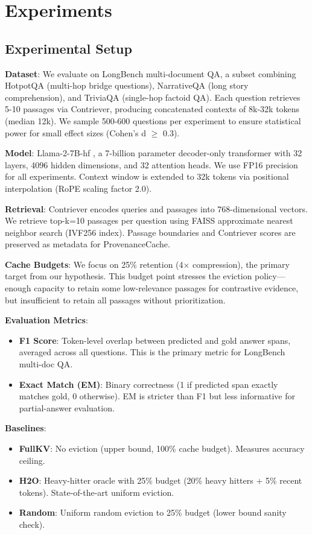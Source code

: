 \section{Experiments}

\subsection{Experimental Setup}

\textbf{Dataset}: We evaluate on LongBench multi-document QA, a subset combining HotpotQA (multi-hop bridge questions), NarrativeQA (long story comprehension), and TriviaQA (single-hop factoid QA). Each question retrieves 5-10 passages via Contriever, producing concatenated contexts of 8k-32k tokens (median 12k). We sample 500-600 questions per experiment to ensure statistical power for small effect sizes (Cohen's d $\geq$ 0.3).

\textbf{Model}: Llama-2-7B-hf \cite{touvron2023llama2}, a 7-billion parameter decoder-only transformer with 32 layers, 4096 hidden dimensions, and 32 attention heads. We use FP16 precision for all experiments. Context window is extended to 32k tokens via positional interpolation (RoPE scaling factor 2.0).

\textbf{Retrieval}: Contriever \cite{izacard2022contriever} encodes queries and passages into 768-dimensional vectors. We retrieve top-k=10 passages per question using FAISS approximate nearest neighbor search (IVF256 index). Passage boundaries and Contriever scores are preserved as metadata for ProvenanceCache.

\textbf{Cache Budgets}: We focus on 25\% retention (4$\times$ compression), the primary target from our hypothesis. This budget point stresses the eviction policy—enough capacity to retain some low-relevance passages for contrastive evidence, but insufficient to retain all passages without prioritization.

\textbf{Evaluation Metrics}:
\begin{itemize}
\item \textbf{F1 Score}: Token-level overlap between predicted and gold answer spans, averaged across all questions. This is the primary metric for LongBench multi-doc QA.
\item \textbf{Exact Match (EM)}: Binary correctness (1 if predicted span exactly matches gold, 0 otherwise). EM is stricter than F1 but less informative for partial-answer evaluation.
\end{itemize}

\textbf{Baselines}:
\begin{itemize}
\item \textbf{FullKV}: No eviction (upper bound, 100\% cache budget). Measures accuracy ceiling.
\item \textbf{H2O}: Heavy-hitter oracle with 25\% budget (20\% heavy hitters + 5\% recent tokens). State-of-the-art uniform eviction.
\item \textbf{Random}: Uniform random eviction to 25\% budget (lower bound sanity check).
\end{itemize}

